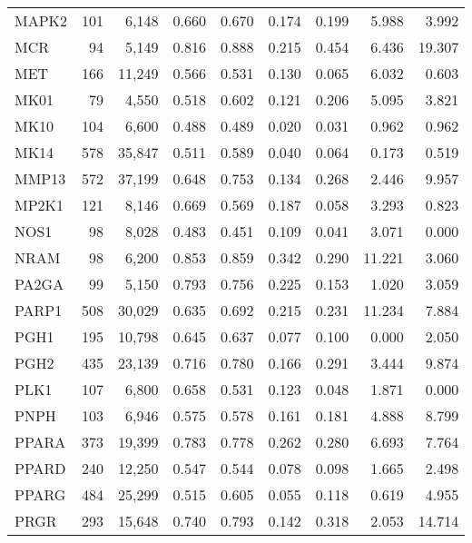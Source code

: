 \begin{center}
\begin{longtable}{lrrrrrrrr}
		MAPK2  & 101   & 6,148    & 0.660   & 0.670   & 0.174   & 0.199   & 5.988   & 3.992  \\
		MCR    & 94    & 5,149    & 0.816   & 0.888   & 0.215   & 0.454   & 6.436   & 19.307 \\
		MET    & 166   & 11,249   & 0.566   & 0.531   & 0.130   & 0.065   & 6.032   & 0.603  \\
		MK01   & 79    & 4,550    & 0.518   & 0.602   & 0.121   & 0.206   & 5.095   & 3.821  \\
		MK10   & 104   & 6,600    & 0.488   & 0.489   & 0.020   & 0.031   & 0.962   & 0.962  \\
		MK14   & 578   & 35,847   & 0.511   & 0.589   & 0.040   & 0.064   & 0.173   & 0.519  \\
		MMP13  & 572   & 37,199   & 0.648   & 0.753   & 0.134   & 0.268   & 2.446   & 9.957  \\
		MP2K1  & 121   & 8,146    & 0.669   & 0.569   & 0.187   & 0.058   & 3.293   & 0.823  \\
		NOS1   & 98    & 8,028    & 0.483   & 0.451   & 0.109   & 0.041   & 3.071   & 0.000  \\
		NRAM   & 98    & 6,200    & 0.853   & 0.859   & 0.342   & 0.290   & 11.221  & 3.060  \\
		PA2GA  & 99    & 5,150    & 0.793   & 0.756   & 0.225   & 0.153   & 1.020   & 3.059  \\
		PARP1  & 508   & 30,029   & 0.635   & 0.692   & 0.215   & 0.231   & 11.234  & 7.884  \\
		PGH1   & 195   & 10,798   & 0.645   & 0.637   & 0.077   & 0.100   & 0.000   & 2.050  \\
		PGH2   & 435   & 23,139   & 0.716   & 0.780   & 0.166   & 0.291   & 3.444   & 9.874  \\
		PLK1   & 107   & 6,800    & 0.658   & 0.531   & 0.123   & 0.048   & 1.871   & 0.000  \\
		PNPH   & 103   & 6,946    & 0.575   & 0.578   & 0.161   & 0.181   & 4.888   & 8.799  \\
		PPARA  & 373   & 19,399   & 0.783   & 0.778   & 0.262   & 0.280   & 6.693   & 7.764  \\
		PPARD  & 240   & 12,250   & 0.547   & 0.544   & 0.078   & 0.098   & 1.665   & 2.498  \\
		PPARG  & 484   & 25,299   & 0.515   & 0.605   & 0.055   & 0.118   & 0.619   & 4.955  \\
		PRGR   & 293   & 15,648   & 0.740   & 0.793   & 0.142   & 0.318   & 2.053   & 14.714 \\

\end{longtable}
\end{center}
